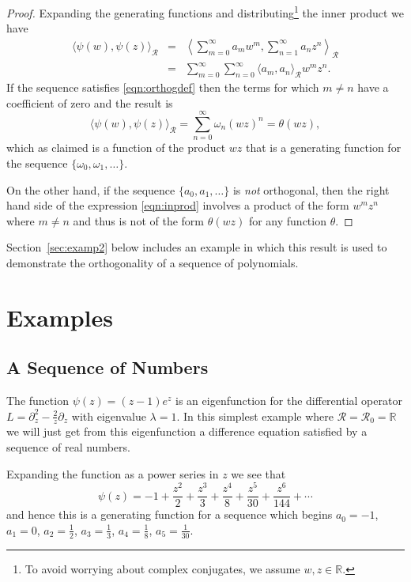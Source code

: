 \documentclass{amsart}
\theoremstyle{definition}
\theoremstyle{remark}
\numberwithin{equation}{section}
\def\R{\mathcal{R}}
\begin{document}
\begin{proof}
Expanding the generating functions and distributing\footnote{To avoid
  worrying about complex conjugates, we
  assume $w,z\in\mathbb{R}$.} the inner product
we have
\begin{eqnarray*}
  \langle \psi(w),\psi(z)\rangle_\R&=&
                                               \left\langle \sum_{m=0}^\infty
                                               a_mw^m,\sum_{n=1}^{\infty}
                                               a_nz^n\right\rangle_\R\\
  &=&\sum_{m=0}^\infty\sum_{n=0}^\infty\langle a_m,a_n\rangle_\R w^mz^n.
\end{eqnarray*}
If the sequence satisfies \eqref{eqn:orthogdef} then the terms for which $m\not=n$ have
a coefficient of zero and the result is
\begin{equation}
  \langle \psi(w),\psi(z)\rangle_\R=\sum_{n=0}^\infty
  \omega_{n}(wz)^n=\theta(wz)\label{eqn:inprod}
  ,
\end{equation}
  which as claimed is a function of the product $wz$ that is a
  generating function for the sequence $\{\omega_0,\omega_1,\ldots\}$.

On the other hand, if the sequence $\{a_0,a_1,\ldots\}$ is
\textit{not} orthogonal, then the right hand side of the expression
\eqref{eqn:inprod} involves a product of the form $w^mz^n$ where
$m\not=n$ and thus is not of the form $\theta(wz)$ for any function $\theta$.
\end{proof}

Section~\ref{sec:examp2} below includes an example in which this result
is used to demonstrate the orthogonality of a sequence of polynomials.


\section{Examples}\label{sec:examples}
\subsection{A Sequence of Numbers}
The function $\psi(z)=(z-1)e^z$ is an eigenfunction for the
differential operator $L=\partial_z^2-\frac{2}{z}\partial_z$ with
eigenvalue $\lambda=1$.
In this simplest example where $\R=\R_0=\mathbb{R}$ we will just get
from this eigenfunction a
difference equation satisfied by a sequence of real numbers.

Expanding the function as a power series in $z$ we see that
$$
\psi(z)=-1+\frac{z^2}{2}+\frac{z^3}{3}+\frac{z^4}{8}+\frac{z^5}{30}+\frac{z^6}{144}+\cdots
$$
and hence this is a generating function for a sequence which begins
$a_0=-1$, $a_1=0$, 
$a_2=\frac12$, $a_3=\frac13$, $a_4=\frac18$, $a_5=\frac1{30}$.
\end{document}

